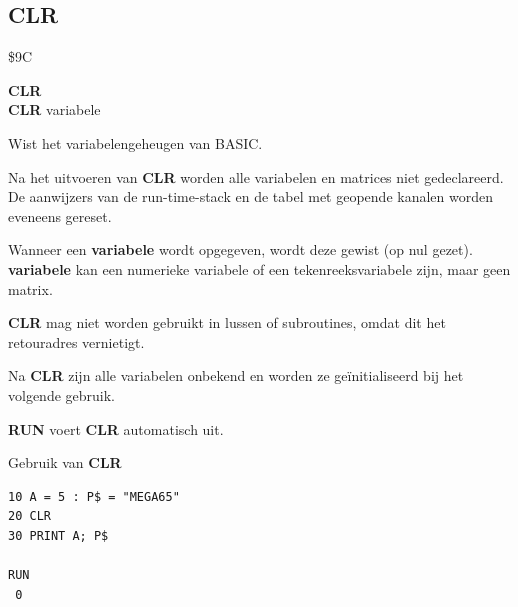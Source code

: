 \subsection{CLR}
\begin{description}[leftmargin=2cm,style=nextline]
\item [Token:]   \$9C

\item [Formaat:]  {\bf CLR} \\                {\bf CLR} variabele

\item [Gebruik:]   Wist het variabelengeheugen van BASIC.

                 Na het uitvoeren van {\bf CLR} worden alle variabelen en matrices niet gedeclareerd. De aanwijzers van de run-time-stack en de tabel met geopende kanalen worden eveneens gereset.

                 Wanneer een {\bf variabele} wordt opgegeven, wordt deze gewist (op nul gezet). {\bf variabele} kan een numerieke variabele of een tekenreeksvariabele zijn, maar geen matrix.

\item [Opmerkingen:] {\bf CLR} mag niet worden gebruikt in lussen of subroutines, omdat dit het retouradres vernietigt.

                 Na {\bf CLR} zijn alle variabelen onbekend en worden ze geïnitialiseerd bij het volgende gebruik.

                 {\bf RUN} voert {\bf CLR} automatisch uit.

\item [Voorbeeld:] Gebruik van {\bf CLR}

\begin{tcolorbox}[colback=black,coltext=white]
\verbatimfont{\codefont}
\begin{verbatim}
10 A = 5 : P$ = "MEGA65"
20 CLR
30 PRINT A; P$

RUN
 0
\end{verbatim}
\end{tcolorbox}
\end{description}


\newpage

